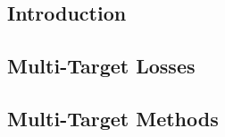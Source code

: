 

\subsection{Introduction}


\subsection{Multi-Target Losses}


\subsection{Multi-Target Methods}

 